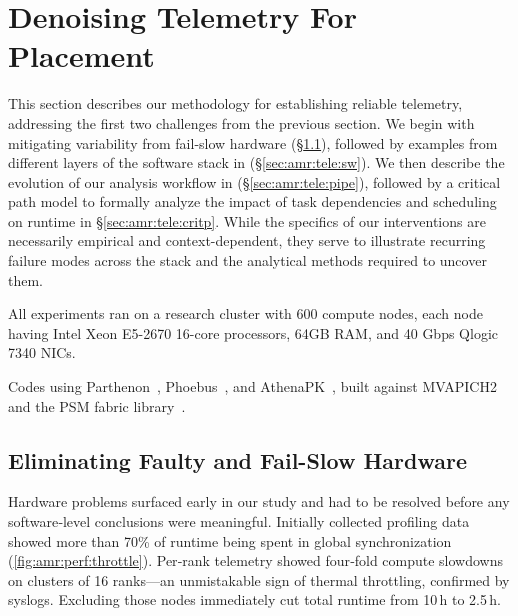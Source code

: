 
\section{Denoising Telemetry For Placement}\label{sec:amr:tele}

This section describes our methodology for establishing reliable telemetry, addressing the first
two challenges from the previous section.
We begin with mitigating variability from fail-slow hardware (\S\ref{sec:amr:tele:hw}), followed by
examples from different layers of the software stack in (\S\ref{sec:amr:tele:sw}).
We then describe the evolution of our analysis workflow in (\S\ref{sec:amr:tele:pipe}), followed by a
critical path model to formally analyze the impact of task dependencies and scheduling on runtime
in \S\ref{sec:amr:tele:critp}.
While the specifics of our interventions are necessarily empirical and context-dependent, they
serve to illustrate recurring failure modes across the stack and the analytical methods required to
uncover them.

All experiments ran on a research cluster with 600 compute nodes, each node having Intel Xeon
E5-2670 16-core processors, 64GB RAM, and 40 Gbps Qlogic 7340 NICs.

Codes using Parthenon~\cite{Grete2023:Parthenon}, Phoebus~\cite{Barke2024:Phoebus}, and
AthenaPK~\cite{Grete2023:Parthenon}, built against MVAPICH2~\cite{Panda2021:MVAPICH} and the PSM
fabric library~\cite{2020:IntelPerformanceScaled}.

\subsection{Eliminating Faulty and Fail-Slow Hardware}\label{sec:amr:tele:hw} \figtunehw

\enlargethispage{-\baselineskip}
Hardware problems surfaced early in our study and had to be resolved before any software‑level
conclusions were meaningful.
Initially collected profiling data showed more than 70\% of runtime being spent in global
synchronization (\cref{fig:amr:perf:throttle}).
Per‑rank telemetry showed four‑fold compute slowdowns on clusters of 16 ranks---an unmistakable
sign of thermal throttling, confirmed by syslogs.
Excluding those nodes immediately cut total runtime from 10\,h to 2.5\,h.

